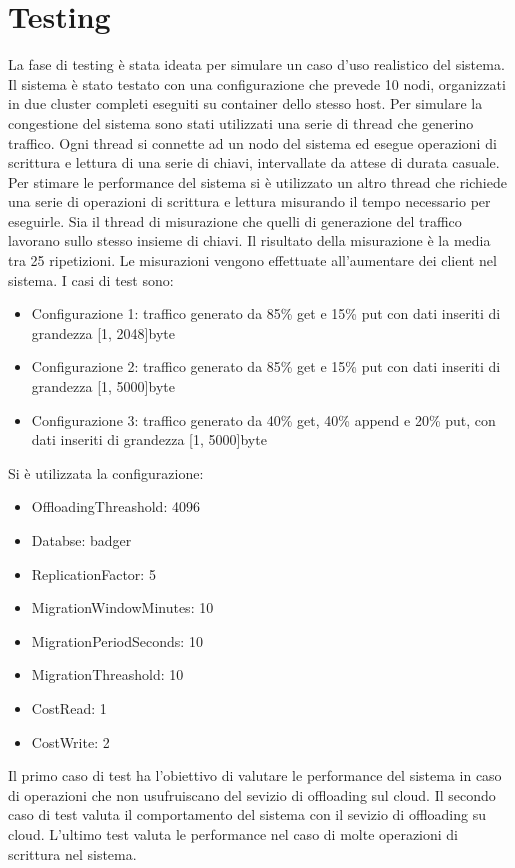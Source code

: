 \documentclass[conference]{IEEEtran}
\begin{document}
\section{Testing}
La fase di testing è stata ideata per simulare un caso d'uso realistico del sistema. Il sistema è stato testato con una
configurazione che prevede 10 nodi, organizzati in due cluster completi eseguiti su container dello stesso host. Per simulare la congestione del sistema sono stati
utilizzati una serie di thread che generino traffico. Ogni thread si connette ad un nodo del sistema
ed esegue operazioni di scrittura e lettura di una serie di chiavi, intervallate da attese di durata casuale. Per stimare le performance del sistema si
è utilizzato un altro thread che richiede una serie di operazioni di scrittura e lettura misurando il tempo necessario per
eseguirle. Sia il thread di misurazione che quelli di generazione del traffico lavorano sullo stesso insieme di chiavi.
Il risultato della misurazione è la media tra 25 ripetizioni.
Le misurazioni vengono effettuate all'aumentare dei client nel sistema. I casi di test sono:
\begin{itemize}
  \item Configurazione 1: traffico generato da 85\% get e 15\% put con dati inseriti di grandezza [1, 2048]byte
  \item Configurazione 2: traffico generato da 85\% get e 15\% put con dati inseriti di grandezza [1, 5000]byte
  \item Configurazione 3: traffico generato da 40\% get, 40\% append e 20\% put, con dati inseriti di grandezza [1, 5000]byte
\end{itemize}
Si è utilizzata la configurazione:
\begin{itemize}
  \item OffloadingThreashold: 4096
  \item Databse: badger
  \item ReplicationFactor: 5
  \item MigrationWindowMinutes: 10
  \item MigrationPeriodSeconds: 10
  \item MigrationThreashold: 10
  \item CostRead: 1
  \item CostWrite: 2
\end{itemize}

Il primo caso di test ha l'obiettivo di valutare le performance del sistema in caso di operazioni che non usufruiscano del
sevizio di offloading sul cloud. Il secondo caso di test valuta il comportamento del sistema con il sevizio di offloading su cloud.
L'ultimo test valuta le performance nel caso di molte operazioni di scrittura nel sistema.
\end{document}
